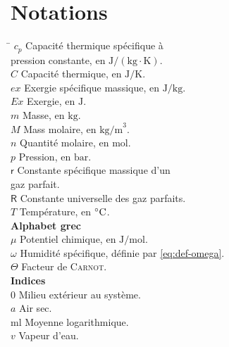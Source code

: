 \documentclass[a4paper,11pt]{scrartcl}
\begin{document}

\section*{Notations} \label{table-notations}

\begin{multicols}{2}
	\begin{tabbing}
		\hspace{0.05\textwidth} \= \hspace{0.45\textwidth} \kill
		$c_p$ \> Capacité thermique spécifique à \\
		\> pression constante, en $\mathrm{J/(kg \cdot K)}$. \\
		$C$ \> Capacité thermique, en $\mathrm{J/K}$. \\
		$ex$ \> Exergie spécifique massique, en $\mathrm{J/kg}$. \\
		$Ex$ \> Exergie, en $\mathrm{J}$. \\
		$m$ \> Masse, en $\mathrm{kg}$. \\
		$M$ \> Mass molaire, en $\mathrm{kg/m}^3$. \\
		$n$ \> Quantité molaire, en $\mathrm{mol}$. \\
		$p$ \> Pression, en $\mathrm{bar}$. \\
		$\mathsf{r}$ \> Constante spécifique massique d'un \\
		\> gaz parfait. \\
		$\mathsf{R}$ \> Constante universelle des gaz parfaits. \\
		$T$ \> Température, en $\degree\mathrm{C}$. \\
		\> \textbf{Alphabet grec} \\
		$\mu$ \> Potentiel chimique, en $\mathrm{J/mol}$. \\
		$\omega$ \> Humidité spécifique, définie par
		\eqref{eq:def-omega}. \\
		$\Theta$ \> Facteur de \textsc{Carnot}. \\
		\> \textbf{Indices} \\
		$0$ \> Milieu extérieur au système. \\
		$a$ \> Air sec. \\
		ml \> Moyenne logarithmique. \\
		$v$ \> Vapeur d'eau. \\
	\end{tabbing}
\end{multicols}

\printbibliography
\end{document}
